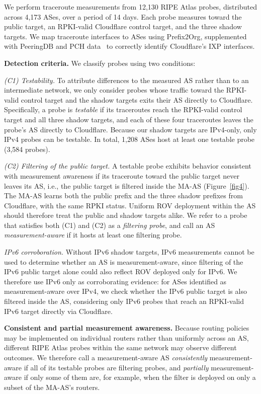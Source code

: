 \documentclass[sigconf, 10pt]{acmart}
\begin{document}
We perform traceroute measurements from 12,130 RIPE Atlas probes, distributed across 4,173 ASes, over a period of 14 days. Each probe measures toward the public target, an RPKI-valid Cloudflare control target, and the three shadow targets. We map traceroute interfaces to ASes using Prefix2Org, supplemented with PeeringDB and PCH data~\cite{peeringdb,pch} to correctly identify Cloudflare's IXP interfaces.

\noindent\textbf{Detection criteria.} We classify probes using two conditions:

\noindent\emph{(C1) Testability.} To attribute differences to the measured AS rather than to an intermediate network, we only consider probes whose traffic toward the RPKI-valid control target and the shadow targets exits their AS directly to Cloudflare. Specifically, a probe is \emph{testable} if its traceroutes reach the RPKI-valid control target and all three shadow targets, and each of these four traceroutes leaves the probe's AS directly to Cloudflare. 
Because our shadow targets are IPv4-only, only IPv4 probes can be testable. In total, 1,208 ASes host at least one testable probe (3,584 probes).

\noindent\emph{(C2) Filtering of the public target.} A testable probe exhibits behavior consistent with measurement awareness if its traceroute toward the public target never leaves its AS, i.e., the public target is filtered inside the MA-AS (Figure~\ref{fig4}). The MA-AS learns both the public prefix and the three shadow prefixes from Cloudflare, with the same RPKI status. Uniform ROV deployment within the AS should therefore treat the public and shadow targets alike. We refer to a probe that satisfies both (C1) and (C2) as a \emph{filtering probe}, and call an AS \emph{measurement-aware} if it hosts at least one filtering probe.

\noindent\emph{IPv6 corroboration.} Without IPv6 shadow targets, IPv6 measurements cannot be used to determine whether an AS is measurement-aware, since filtering of the IPv6 public target alone could also reflect ROV deployed only for IPv6. We therefore use IPv6 only as corroborating evidence: for ASes identified as measurement-aware over IPv4, we check whether the IPv6 public target is also filtered inside the AS, considering only IPv6 probes that reach an RPKI-valid IPv6 target directly via Cloudflare.

\noindent\textbf{Consistent and partial measurement awareness.} Because routing policies may be implemented on individual routers rather than uniformly across an AS, different RIPE Atlas probes within the same network may observe different outcomes. We therefore call a measurement-aware AS \emph{consistently} measurement-aware if all of its testable probes are filtering probes, and \emph{partially} measurement-aware if only some of them are, for example, when the filter is deployed on only a subset of the MA-AS's routers.
\end{document}
